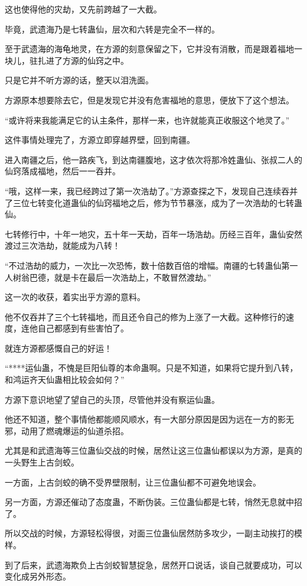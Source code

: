 \begin{this_body}
这也使得他的灾劫，又先前跨越了一大截。

毕竟，武遗海乃是七转蛊仙，层次和六转是完全不一样的。

至于武遗海的海龟地灵，在方源的刻意保留之下，它并没有消散，而是跟着福地一块儿，驻扎进了方源的仙窍之中。

只是它并不听方源的话，整天以泪洗面。

方源原本想要除去它，但是发现它并没有危害福地的意思，便放下了这个想法。

“或许将来我能满足它的认主条件，那样一来，也许就能真正收服这个地灵了。”

这件事情处理完了，方源立即穿越界壁，回到南疆。

进入南疆之后，他一路疾飞，到达南疆腹地，这才依次将那冷姓蛊仙、张叔二人的仙窍落成福地，然后一一吞并。

“哦，这样一来，我已经跨过了第一次浩劫了。”方源查探之下，发现自己连续吞并了三位七转变化道蛊仙的仙窍福地之后，修为节节暴涨，成为了一次浩劫的七转蛊仙。

七转修行中，十年一地灾，五十年一天劫，百年一场浩劫。历经三百年，蛊仙安然渡过三次浩劫，就能成为八转！

“不过浩劫的威力，一次比一次恐怖，数十倍数百倍的增幅。南疆的七转蛊仙第一人树翁巴德，就是卡在最后一次浩劫上，不敢冒然渡劫。”

这一次的收获，着实出乎方源的意料。

他不仅吞并了三个七转福地，而且还令自己的修为上涨了一大截。这种修行的速度，连他自己都感到有些害怕了。

就连方源都感慨自己的好运！

“****运仙蛊，不愧是巨阳仙尊的本命蛊啊。只是不知道，如果将它提升到八转，和鸿运齐天仙蛊相比较会如何？”

方源下意识地望了望自己的头顶，尽管他并没有察运仙蛊。

他还不知道，整个事情他都能顺风顺水，有一大部分原因是因为远在一方的影无邪，动用了燃魂爆运的仙道杀招。

尤其是和武遗海等三位蛊仙交战的时候，居然让这三位蛊仙都误以为方源，是真的一头野生上古剑蛟。

一方面，上古剑蛟的确不受界壁限制，让三位蛊仙都不可避免地误会。

另一方面，方源还催动了态度蛊，不断伪装。三位蛊仙都是七转，悄然无息就中招了。

所以交战的时候，方源轻松得很，对面三位蛊仙居然防多攻少，一副主动挨打的模样。

到了后来，武遗海欺负上古剑蛟智慧捉急，居然开口说话，谈自己就要成功，可以变化成另外形态。


\end{this_body}
